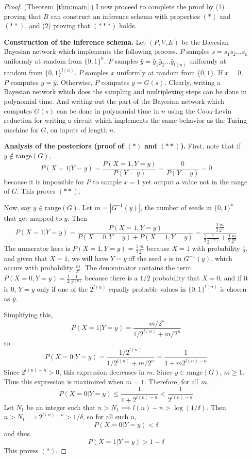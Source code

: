 \documentclass{article}
\theoremstyle{definition}
\theoremstyle{remark}
\begin{document}
\begin{proof}{(Theorem~\ref{thm:main}.)}
I now proceed to complete the proof by (1) proving that $B$ can construct an inference schema with properties $(*)$ and $(**)$, and (2) proving that $(***)$ holds.

\medskip
\noindent \textbf{Construction of the inference schema.}
Let $(P, V, E)$ be the Bayesian Bayesian network which implements the following process.
$P$ samples $s = s_1 s_2 \dots s_n$ uniformly at random from $\{0, 1\}^n$.
$P$ samples $\bar{y} = \bar{y}_1 \bar{y}_2 \dots \bar{y}_{l(n)}$ uniformly at random from $\{0, 1\}^{l(n)}$.
$P$ samples $x$ uniformly at random from $\{0, 1\}$.
If $x = 0$, $P$ computes $y = \bar{y}$.
Otherwise, $P$ computes $y = G(s)$.
Clearly, writing a Bayesian network which does the sampling and multiplexing steps can be done in polynomial time.
And writing out the part of the Bayesian network which computes $G(s)$ can be done in polynomial time in $n$ using the Cook-Levin reduction for writing a circuit which implements the same behavior as the Turing machine for $G$, on inputs of length $n$.

\medskip
\noindent \textbf{Analysis of the posteriors (proof of $(*)$ and $(**)$).}
First, note that if $y \notin \text{range}(G)$,
$$
P(X = 1 | Y = y) = \frac{P(X = 1, Y = y)}{P(Y = y)} = \frac{0}{P(Y = y)} = 0
$$
because it is impossible for $P$ to sample $x = 1$ yet output a value not in the range of $G$.
This proves $(**)$.

Now, say $y \in \text{range}(G)$.
Let $m = |G^{-1}(y)|$, the number of seeds in $\{0, 1\}^n$ that get mapped to $y$.
Then
$$
P(X = 1 | Y = y) = \frac{P(X = 1, Y = y)}{P(X = 0, Y = y) + P(X = 1, Y = y)}
= \frac{
    \frac{1}{2} \frac{m}{2^n}
}{
    \frac{1}{2} \frac{1}{2^{l(n)}} + \frac{1}{2} \frac{m}{2^n}
}
$$
The numerator here is $P(X = 1, Y = y) = \frac{1}{2} \frac{m}{2^n}$ 
because $X = 1$ with probability $\frac{1}{2}$, and given that $X = 1$, we will have $Y = y$ iff the seed $s$ is in $G^{-1}(y)$, which occurs with probability $\frac{m}{2^n}$.
The denominator contains the term $P(X = 0, Y = y) = \frac{1}{2} \frac{1}{2^{l(n)}}$ because there is a $1/2$ probability that $X = 0$, and if it is $0$, $Y = y$ only if one of the $2^{l(n)}$ equally probable values in $\{0, 1\}^{l(n)}$ is chosen as $\bar{y}$.

Simplifying this, 
$$
P(X = 1 | Y = y) = \frac{
    m/2^n
}{
    1/2^{l(n)} + m/2^n
}
$$
so
$$
P(X = 0 | Y = y) = \frac{
    1/2^{l(n)}
}{
    1/2^{l(n)} + m/2^n
} = \frac{1}{1 + m 2^{l(n) - n}}
$$
Since $2^{l(n) - n} > 0$, this expression decreases in $m$.
Since $y \in \text{range}(G)$, $m \geq 1$.
Thus this expression is maximized when $m = 1$.
Therefore, for all $m$,
$$
P(X = 0 | Y = y) \leq \frac{1}{1 + 2^{l(n) - n}} < \frac{1}{2^{l(n) - n}}
$$
Let $N_1$ be an integer such that
$n > N_1 \implies l(n) - n > \log(1/\delta)$.
Then $n > N_1 \implies 2^{l(n) - n} > 1/\delta$,
so for all such $n$,
$$
P(X = 0 | Y = y) < \delta
$$
and thus
$$
P(X = 1 | Y = y) > 1 - \delta
$$
This proves $(*)$.


\end{proof}
\end{document}
